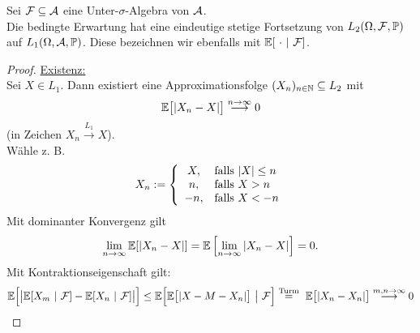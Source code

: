 \setcounter{satz}{5} %
\begin{proposition}\label{Prop1.6} %
	Sei $\mathcal{F}\subseteq\mathcal{A}$ eine Unter-$\sigma$-Algebra von $\mathcal{A}$.\\
	Die bedingte Erwartung hat eine eindeutige stetige Fortsetzung von $L_2(\Omega,\mathcal{F},\mathbb{P})$ auf $L_1(\Omega,\mathcal{A},\mathbb{P})$.
	Diese bezeichnen wir ebenfalls mit $\mathbb{E}[~\cdot~|~\mathcal{F}]$.
\end{proposition}

\begin{proof}
	\underline{Existenz:}\\
	Sei $X\in L_1$. Dann existiert eine Approximationsfolge $(X_n)_{n\in\mathbb{N}}\subseteq L_2$ mit 
	\[\mathbb{E}\big[|X_n-X|\big]\stackrel{n\to\infty}{\longrightarrow}0\] 
	(in Zeichen $X_n\stackrel{L_1}{\longrightarrow} X$).\\
	Wähle z. B.
	\begin{align*}
		X_n:=\left\lbrace\begin{array}{cl}
			X, & \text{falls } |X|\leq n\\
			n, & \text{falls } X>n\\
			-n, & \text{falls } X<-n
		\end{array}\right.
	\end{align*}
	Mit dominanter Konvergenz gilt 
	\begin{align*}
		\lim\limits_{n\to\infty}\mathbb{E}[|X_n-X|]=\mathbb{E}\left[\lim\limits_{n\to\infty}|X_n-X|\right]=0.
	\end{align*}
	Mit Kontraktionseigenschaft gilt:
	\begin{align*}
		\mathbb{E}\Big[\big|\mathbb{E}[X_m~|~\mathcal{F}]-\mathbb{E}[X_n~|~\mathcal{F}]\big|\Big]
		\leq\mathbb{E}\Big[\mathbb{E}\big[|X-M-X_n|\big]~\big|~\mathcal{F}\Big]
		\stackrel{\text{Turm}}{=}~
		\mathbb{E}\big[|X_n-X_n|\big]
		\stackrel{m,n\to\infty}{\longrightarrow}
		0
	\end{align*}
	

\end{proof}
